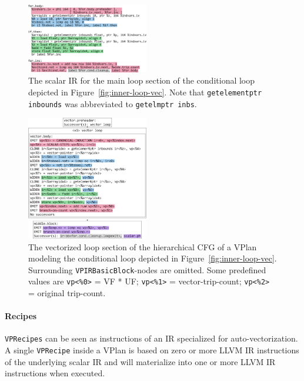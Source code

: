 \documentclass[sigplan,11pt,nonacm]{acmart}
\begin{document}
\begin{figure}
  \centering
  \includegraphics[width=0.475\textwidth]{images/inner-loop-scalar-loop-ir-color.png}
  \caption{The scalar IR for the main loop section of the conditional loop depicted in
  Figure~\ref{fig:inner-loop-vec}. Note that \texttt{getelementptr inbounds}
  was abbreviated to \texttt{getelmptr inbs}.}
  \label{fig:inner-loop-scalar-ir}
\end{figure}

\begin{figure}
  \centering
  \includegraphics[width=0.475\textwidth]{images/inner-loop-vplan-hcfg-loop-body-color.png}
  \caption{The vectorized loop section of the hierarchical CFG of a VPlan modeling the 
  conditional loop depicted in Figure~\ref{fig:inner-loop-vec}. 
  Surrounding \texttt{VPIRBasicBlock}-nodes are omitted.
  Some predefined values are
  \texttt{vp<\%0>} = VF * UF; \texttt{vp<\%1>} = vector-trip-count; \texttt{vp<\%2>} = original trip-count.}
  \label{fig:inner-loop-vplan-hcfg-body}
\end{figure}

\paragraph{Recipes}

\texttt{VPRecipes} can be seen as instructions of an IR specialized for auto-vectorization. 
A single \texttt{VPRecipe} inside a VPlan is based on zero or more LLVM IR instructions of the 
underlying scalar IR and will materialize into one or more LLVM IR instructions when executed.
\end{document}
